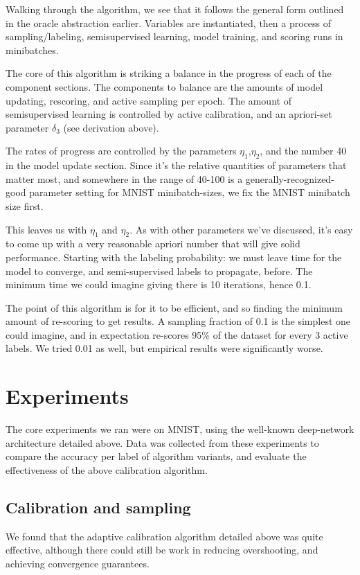\documentclass{article}
\begin{document}
Walking through the algorithm, we see that it follows the general form outlined in the oracle abstraction earlier.  Variables are instantiated, then a process of sampling/labeling, semisupervised learning, model training, and scoring runs in minibatches.  

The core of this algorithm is striking a balance in the progress of each of the component sections.  The components to balance are the amounts of model updating, rescoring, and active sampling per epoch.  The amount of semisupervised learning is controlled by active calibration, and an apriori-set parameter $\delta_3$ (see derivation above).  

The rates of progress are controlled by the parameters $\eta_1$,$\eta_2$, and the number 40 in the model update section.  Since it's the relative quantities of parameters that matter most, and somewhere in the range of 40-100 is a generally-recognized-good parameter setting for MNIST minibatch-sizes, we fix the MNIST minibatch size first.  

This leaves us with $\eta_1$ and $\eta_2$.  As with other parameters we've discussed, it's easy to come up with a very reasonable apriori number that will give solid performance.  Starting with the labeling probability: we must leave time for the model to converge, and semi-supervised labels to propagate, before.  The minimum time we could imagine giving there is 10 iterations, hence 0.1.  

The point of this algorithm is for it to be efficient, and so finding the minimum amount of re-scoring to get results.  A sampling fraction of 0.1 is the simplest one could imagine, and in expectation re-scores 95\% of the dataset for every 3 active labels.  We tried 0.01 as well, but empirical results were significantly worse.  



\section{Experiments}
The core experiments we ran were on MNIST, using the well-known deep-network architecture detailed above.  Data was collected from these experiments to compare the accuracy per label of algorithm variants, and evaluate the effectiveness of the above calibration algorithm.  

\subsection{Calibration and sampling}
We found that the adaptive calibration algorithm detailed above was quite effective, although there could still be work in reducing overshooting, and achieving convergence guarantees.  
\end{document}
